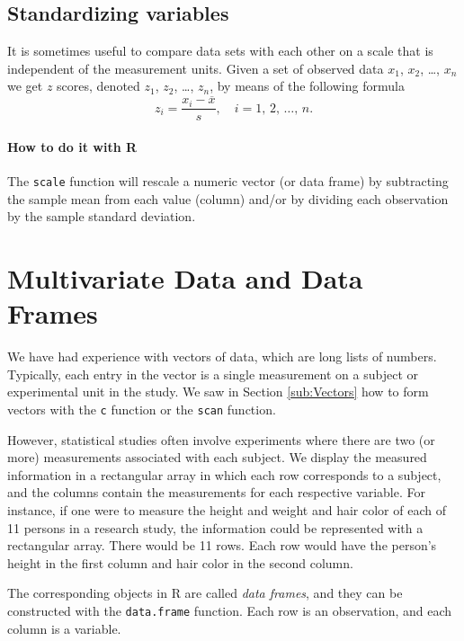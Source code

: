 \documentclass[captions=tableheading]{scrbook}
\begin{document}
\subsection{Standardizing variables}
\label{sec-3-4-5}


It is sometimes useful to compare data sets with each other on a scale that is independent of the measurement units. Given a set of observed data \(x_{1}\), \(x_{2}\), \ldots{}, \(x_{n}\) we get \(z\) scores, denoted \(z_{1}\), \(z_{2}\), \ldots{}, \(z_{n}\), by means of the following formula
\[
z_{i}=\frac{x_{i}-\overline{x}}{s},\quad i=1,\,2,\,\ldots,\, n.
\]

\paragraph*{How to do it with \textsf{R}}

The \texttt{scale} function will rescale a numeric vector (or data frame) by subtracting the sample mean from each value (column) and/or by dividing each observation by the sample standard deviation.
\section{Multivariate Data and Data Frames}
\label{sec-3-5}

\label{sec:multivariate-data}

We have had experience with vectors of data, which are long lists of numbers. Typically, each entry in the vector is a single measurement on a subject or experimental unit in the study. We saw in Section \ref{sub:Vectors} how to form vectors with the \texttt{c} function or the \texttt{scan} function. 

However, statistical studies often involve experiments where there are two (or more) measurements associated with each subject. We display the measured information in a rectangular array in which each row corresponds to a subject, and the columns contain the measurements for each respective variable. For instance, if one were to measure the height and weight and hair color of each of 11 persons in a research study, the information could be represented with a rectangular array. There would be 11 rows. Each row would have the person's height in the first column and hair color in the second column.

The corresponding objects in \textsf{R} are called \emph{data frames}, and they can be constructed with the \texttt{data.frame} function. Each row is an observation, and each column is a variable.
\end{document}
